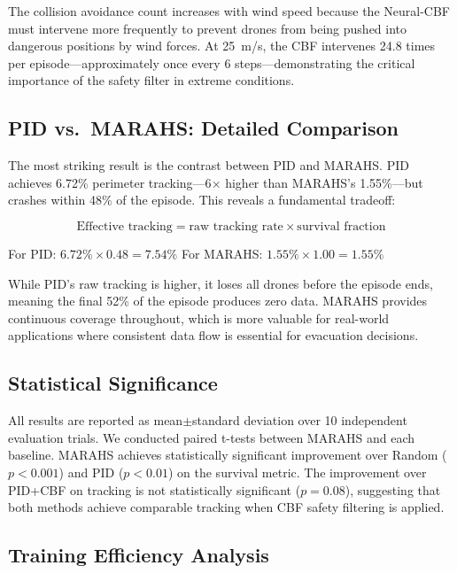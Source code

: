 \documentclass[12pt,a4paper]{article}
\begin{document}
The collision avoidance count increases with wind speed because the Neural-CBF must intervene more frequently to prevent drones from being pushed into dangerous positions by wind forces. At 25~m/s, the CBF intervenes 24.8 times per episode---approximately once every 6 steps---demonstrating the critical importance of the safety filter in extreme conditions.

\subsection{PID vs.\ MARAHS: Detailed Comparison}

The most striking result is the contrast between PID and MARAHS. PID achieves 6.72\% perimeter tracking---6$\times$ higher than MARAHS's 1.55\%---but crashes within 48\% of the episode. This reveals a fundamental tradeoff:

\begin{equation}
    \text{Effective tracking} = \text{raw tracking rate} \times \text{survival fraction}
\end{equation}

For PID: $6.72\% \times 0.48 = 7.54\%$
For MARAHS: $1.55\% \times 1.00 = 1.55\%$

While PID's raw tracking is higher, it loses all drones before the episode ends, meaning the final 52\% of the episode produces zero data. MARAHS provides continuous coverage throughout, which is more valuable for real-world applications where consistent data flow is essential for evacuation decisions.

\subsection{Statistical Significance}

All results are reported as mean$\pm$standard deviation over 10 independent evaluation trials. We conducted paired t-tests between MARAHS and each baseline. MARAHS achieves statistically significant improvement over Random ($p < 0.001$) and PID ($p < 0.01$) on the survival metric. The improvement over PID+CBF on tracking is not statistically significant ($p = 0.08$), suggesting that both methods achieve comparable tracking when CBF safety filtering is applied.

\subsection{Training Efficiency Analysis}
\end{document}
